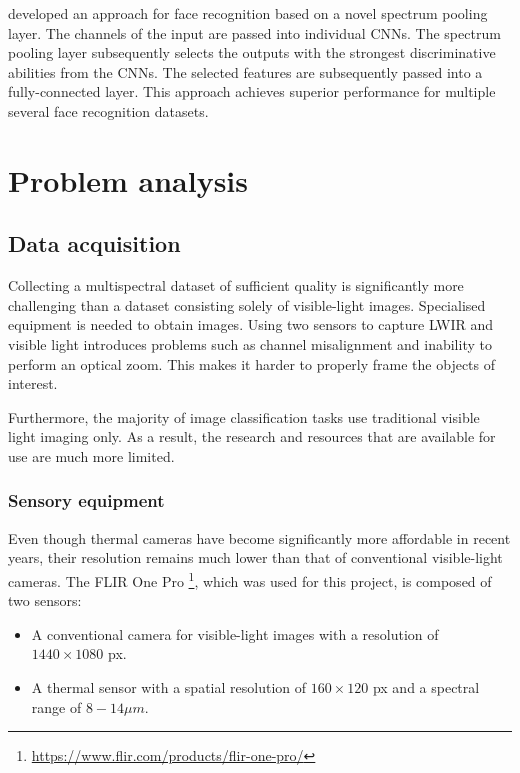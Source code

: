 \documentclass{l4proj}
\begin{document}
\citet{wu_intraspectrum_2020} developed an approach for face recognition based on a novel spectrum pooling layer. The channels of the input are passed into individual CNNs. The spectrum pooling layer subsequently selects the outputs with the strongest discriminative abilities from the CNNs. The selected features are subsequently passed into a fully-connected layer. This approach achieves superior performance for multiple several face recognition datasets.


\chapter{Problem analysis}
\label{analysis}

\section{Data acquisition}

Collecting a multispectral dataset of sufficient quality is significantly more challenging than a dataset consisting solely of visible-light images. Specialised equipment is needed to obtain images. Using two sensors to capture LWIR and visible light introduces problems such as channel misalignment and inability to perform an optical zoom. This makes it harder to properly frame the objects of interest.

Furthermore, the majority of image classification tasks use traditional visible light imaging only. As a result, the research and resources that are available for use are much more limited.

\subsection{Sensory equipment}

Even though thermal cameras have become significantly more affordable in recent years, their resolution remains much lower than that of conventional visible-light cameras. The FLIR One Pro \footnote{\url{https://www.flir.com/products/flir-one-pro/}}, which was used for this project, is composed of two sensors:

\begin{itemize}
  \item A conventional camera for visible-light images with a resolution of $1440 \times 1080$ px.
  \item A thermal sensor with a spatial resolution of $160 \times 120$ px and a spectral range of $8 - 14 \mu m$.
\end{itemize}
\end{document}
